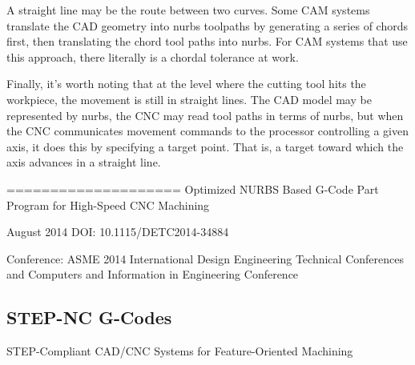 A straight line may be the route between two curves. Some CAM systems translate the CAD geometry into nurbs toolpaths by generating a series of chords first, then translating the chord tool paths into nurbs. For CAM systems that use this approach, there literally is a chordal tolerance at work.

Finally, it's worth noting that at the level where the cutting tool hits the workpiece, the movement is still in straight lines. The CAD model may be represented by nurbs, the CNC may read tool paths in terms of nurbs, but when the CNC communicates movement commands to the processor controlling a given axis, it does this by specifying a target point. That is, a target toward which the axis advances in a straight line.

====================
Optimized NURBS Based G-Code Part Program for High-Speed CNC Machining

August 2014 
DOI: 10.1115/DETC2014-34884

Conference: ASME 2014 International Design Engineering Technical Conferences and Computers and Information in Engineering Conference




\subsection{STEP-NC G-Codes}

\cite{STEP-NC_2018} STEP-Compliant CAD/CNC Systems for Feature-Oriented Machining\\

